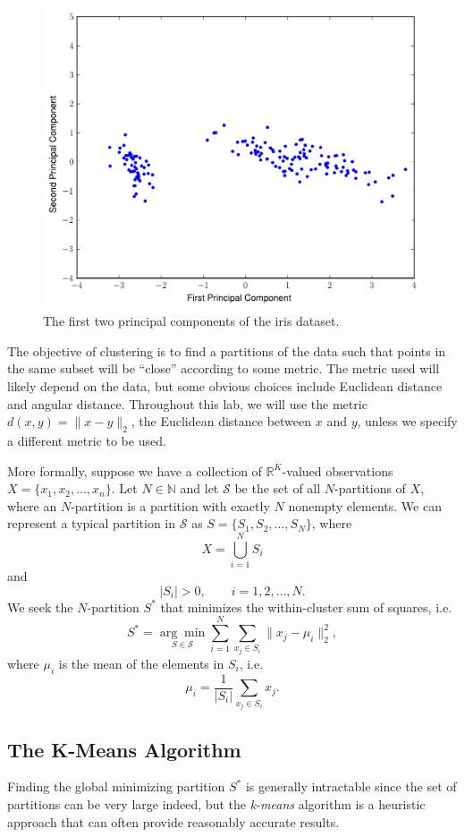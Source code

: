 \begin{figure}
\centering
\includegraphics[width=.7\textwidth]{figures/iris_pca.pdf}
\caption{The first two principal components of the iris dataset.}
\label{fig:iris_data}
\end{figure}

The objective of clustering is to find a partitions of the data such that points in the same subset will be ``close'' according to some metric.
The metric used will likely depend on the data, but some obvious choices include Euclidean distance and angular distance.
Throughout this lab, we will use the metric $d(x,y) = \|x-y\|_2$, the Euclidean distance between $x$ and $y$, unless we specify a different metric to be used.

More formally, suppose we have a collection of $\mathbb{R}^K$-valued observations $X = \{x_1,x_2,\ldots,x_n\}$.
Let $N \in \mathbb{N}$ and let $\mathcal{S}$ be the set of all $N$-partitions of $X$, where an $N$-partition is a partition with exactly $N$ nonempty elements.
We can represent a typical partition in $\mathcal{S}$ as $S = \{S_1,S_2,\ldots,S_N\}$, where
\[
X = \bigcup_{i=1}^N S_i
\]
and
\[
|S_i| > 0, \qquad i=1,2,\ldots,N.
\]
We seek the $N$-partition $S^*$ that minimizes the within-cluster sum of squares, i.e.
\[
S^* = \underset{S\in\mathcal{S}}{\arg\min} \sum_{i=1}^N\sum_{x_j\in S_i}\|x_j-\mu_i\|_2^2,
\]
where $\mu_i$ is the mean of the elements in $S_i$, i.e.
\[
\mu_i = \frac{1}{|S_i|}\sum_{x_j\in S_i}x_j.
\]

\subsection*{The K-Means Algorithm}

Finding the global minimizing partition $S^*$ is generally intractable since the set of partitions can be very large indeed,
but the \emph{k-means} algorithm is a heuristic approach that can often provide reasonably accurate results.


